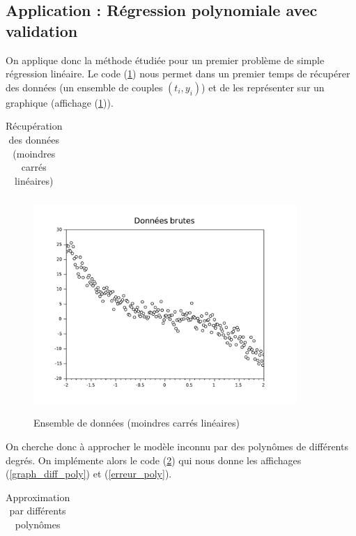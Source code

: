 \documentclass[a4paper,10pt]{report}
\begin{document}
\subsection{Application : Régression polynomiale avec validation}
On applique donc la méthode étudiée pour un premier problème de simple régression linéaire. Le code (\ref{donnes}) nous permet dans un premier temps de récupérer des données (un ensemble de couples $(t_i,y_i)$) et de les représenter sur un graphique (affichage (\ref{donnes_graph})).
\begin{table}[H]
\caption{Récupération des données (moindres carrés linéaires)}
\begin{tabular}{l}

\label{donnes}
\end{tabular}
\end{table}

\begin{figure}[H]
\centering
\caption{Ensemble de données (moindres carrés linéaires)}
\includegraphics[width=10cm]{donnes_brutes.pdf}
\label{donnes_graph}
\end{figure}

On cherche donc à approcher le modèle inconnu par des polynômes de différents degrés. On implémente alors le code (\ref{diff_poly}) qui nous donne les affichages  (\ref{graph_diff_poly}) et (\ref{erreur_poly}).
\begin{table}[H]
\caption{Approximation par différents polynômes}
\begin{tabular}{l}

\label{diff_poly}
\end{tabular}
\end{table}
\end{document}
